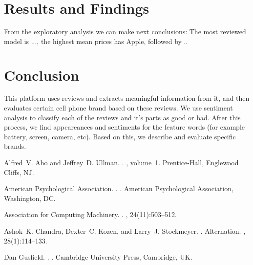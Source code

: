 \documentclass[11pt]{article}
\begin{document}
\section{Results and Findings}
From the exploratory analysis we can make next conclusions: The most reviewed model is ..., the highest mean prices has Apple, followed by .. 


\section{Conclusion}
This platform uses reviews and extracts meaningful information from it, and then evaluates certain cell phone brand based on these reviews. We use sentiment analysis to classify each of the reviews and it's parts as good or bad. After this process, we find appeareances and sentiments for the feature words (for example battery, screen, camera, etc). Based on this, we describe and evaluate specific brands. 


\begin{thebibliography}{}

Alfred~V. Aho and Jeffrey~D. Ullman.
.
, volume~1.
\newblock Prentice-{Hall}, Englewood Cliffs, NJ.

{American Psychological Association}.
.
.
\newblock American Psychological Association, Washington, DC.

{Association for Computing Machinery}.
.
, 24(11):503--512.

Ashok~K. Chandra, Dexter~C. Kozen, and Larry~J. Stockmeyer.
.
\newblock Alternation.
,
  28(1):114--133.

Dan Gusfield.
.
.
\newblock Cambridge University Press, Cambridge, UK.

\end{thebibliography}
\end{document}
